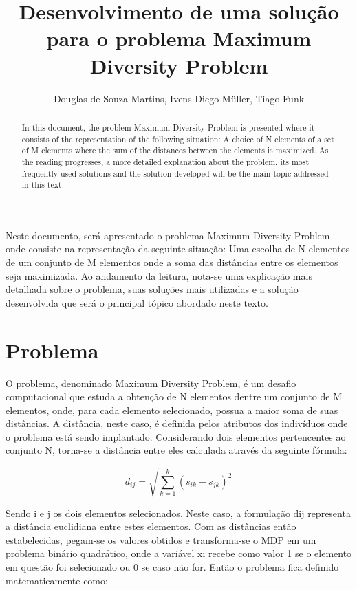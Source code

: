 \documentclass[12pt]{article}
\title{Desenvolvimento de uma solução para o problema Maximum Diversity Problem}
\author{Douglas de Souza Martins\inst{1}, Ivens Diego Müller\inst{1}, Tiago Funk\inst{1}}
\begin{document}
 

\maketitle

\begin{abstract}
  In this document, the problem Maximum Diversity Problem is presented where it consists of the representation of the following situation: A choice of N elements of a set of M elements where the sum of the distances between the elements is maximized. As the reading progresses, a more detailed explanation about the problem, its most frequently used solutions and the solution developed will be the main topic addressed in this text.
\end{abstract}
     
\begin{resumo} 
  Neste documento, será apresentado o problema Maximum Diversity Problem onde consiste na representação da seguinte situação: Uma escolha de N elementos de um conjunto de M elementos onde a soma das distâncias entre os elementos seja maximizada. Ao andamento da leitura, nota-se uma explicação mais detalhada sobre o problema, suas soluções mais utilizadas e a solução desenvolvida que será o principal tópico abordado neste texto.
\end{resumo}

\section{Problema}

O problema, denominado Maximum Diversity Problem, é um desafio computacional que estuda a obtenção de N elementos dentre um conjunto de M elementos, onde, para cada elemento selecionado, possua a maior soma de suas distâncias. A distância, neste caso, é definida pelos atributos dos indivíduos onde o problema está sendo implantado. Considerando dois elementos pertencentes ao conjunto N, torna-se a distância entre eles calculada através da seguinte fórmula:

\begin{equation}
    d_{ij}=\sqrt{ \sum_{k=1}^{k} (s_{ik}-s_{jk})^{2} }
\end{equation}

Sendo i e j os dois elementos selecionados. Neste caso, a formulação dij representa a distância euclidiana entre estes elementos. Com as distâncias então estabelecidas, pegam-se os valores obtidos e transforma-se o MDP em um problema binário quadrático, onde a variável xi recebe como valor 1 se o elemento em questão foi selecionado ou 0 se caso não for. Então o problema fica definido matematicamente como:
\end{document}
